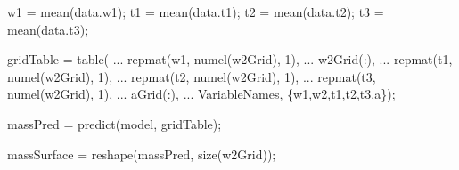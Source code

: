 \documentclass[
  letterpaper,
  DIV=11,
  numbers=noendperiod]{scrartcl}
\newenvironment{Shaded}{\begin{snugshade}}{\end{snugshade}}
\newcommand{\FloatTok}[1]{\textcolor[rgb]{0.68,0.00,0.00}{#1}}
\newcommand{\NormalTok}[1]{\textcolor[rgb]{0.00,0.23,0.31}{#1}}
\newcommand{\OperatorTok}[1]{\textcolor[rgb]{0.37,0.37,0.37}{#1}}
\newcommand{\SpecialStringTok}[1]{\textcolor[rgb]{0.13,0.47,0.30}{#1}}
\newcommand{\VariableTok}[1]{\textcolor[rgb]{0.07,0.07,0.07}{#1}}
\begin{document}
\begin{Shaded}
\begin{Highlighting}[]
\VariableTok{w1} \OperatorTok{=} \VariableTok{mean}\NormalTok{(}\VariableTok{data}\NormalTok{.}\VariableTok{w1}\NormalTok{)}\OperatorTok{;}
\VariableTok{t1} \OperatorTok{=} \VariableTok{mean}\NormalTok{(}\VariableTok{data}\NormalTok{.}\VariableTok{t1}\NormalTok{)}\OperatorTok{;}
\VariableTok{t2} \OperatorTok{=} \VariableTok{mean}\NormalTok{(}\VariableTok{data}\NormalTok{.}\VariableTok{t2}\NormalTok{)}\OperatorTok{;}
\VariableTok{t3} \OperatorTok{=} \VariableTok{mean}\NormalTok{(}\VariableTok{data}\NormalTok{.}\VariableTok{t3}\NormalTok{)}\OperatorTok{;}

\VariableTok{gridTable} \OperatorTok{=} \VariableTok{table}\NormalTok{( }\OperatorTok{...}
    \VariableTok{repmat}\NormalTok{(}\VariableTok{w1}\OperatorTok{,} \VariableTok{numel}\NormalTok{(}\VariableTok{w2Grid}\NormalTok{)}\OperatorTok{,} \FloatTok{1}\NormalTok{)}\OperatorTok{,} \OperatorTok{...}
    \VariableTok{w2Grid}\NormalTok{(}\OperatorTok{:}\NormalTok{)}\OperatorTok{,} \OperatorTok{...}
    \VariableTok{repmat}\NormalTok{(}\VariableTok{t1}\OperatorTok{,} \VariableTok{numel}\NormalTok{(}\VariableTok{w2Grid}\NormalTok{)}\OperatorTok{,} \FloatTok{1}\NormalTok{)}\OperatorTok{,} \OperatorTok{...}
    \VariableTok{repmat}\NormalTok{(}\VariableTok{t2}\OperatorTok{,} \VariableTok{numel}\NormalTok{(}\VariableTok{w2Grid}\NormalTok{)}\OperatorTok{,} \FloatTok{1}\NormalTok{)}\OperatorTok{,} \OperatorTok{...}
    \VariableTok{repmat}\NormalTok{(}\VariableTok{t3}\OperatorTok{,} \VariableTok{numel}\NormalTok{(}\VariableTok{w2Grid}\NormalTok{)}\OperatorTok{,} \FloatTok{1}\NormalTok{)}\OperatorTok{,} \OperatorTok{...}
    \VariableTok{aGrid}\NormalTok{(}\OperatorTok{:}\NormalTok{)}\OperatorTok{,} \OperatorTok{...}
    \SpecialStringTok{\textquotesingle{}VariableNames\textquotesingle{}}\OperatorTok{,}\NormalTok{ \{}\SpecialStringTok{\textquotesingle{}w1\textquotesingle{}}\OperatorTok{,}\SpecialStringTok{\textquotesingle{}w2\textquotesingle{}}\OperatorTok{,}\SpecialStringTok{\textquotesingle{}t1\textquotesingle{}}\OperatorTok{,}\SpecialStringTok{\textquotesingle{}t2\textquotesingle{}}\OperatorTok{,}\SpecialStringTok{\textquotesingle{}t3\textquotesingle{}}\OperatorTok{,}\SpecialStringTok{\textquotesingle{}a\textquotesingle{}}\NormalTok{\})}\OperatorTok{;}

\VariableTok{massPred} \OperatorTok{=} \VariableTok{predict}\NormalTok{(}\VariableTok{model}\OperatorTok{,} \VariableTok{gridTable}\NormalTok{)}\OperatorTok{;}

\VariableTok{massSurface} \OperatorTok{=} \VariableTok{reshape}\NormalTok{(}\VariableTok{massPred}\OperatorTok{,} \VariableTok{size}\NormalTok{(}\VariableTok{w2Grid}\NormalTok{))}\OperatorTok{;}


\end{Highlighting}
\end{Shaded}
\end{document}
